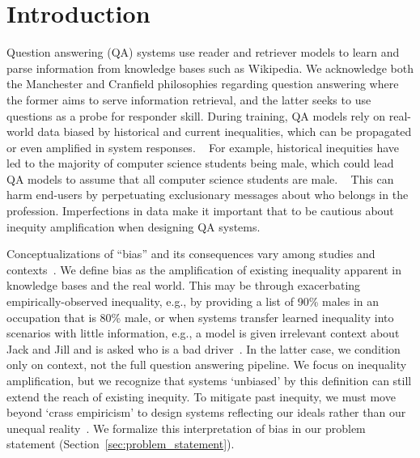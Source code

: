 \section{Introduction}
\label{introduction}
Question answering (QA) systems use reader and retriever models to learn and parse information from knowledge bases such as Wikipedia.  We acknowledge both the Manchester and Cranfield philosophies regarding question answering where the former aims to serve information retrieval, and the latter seeks to use questions as a probe for responder skill.  
During training, QA models rely on real-world data biased by historical and current inequalities, which can be propagated or even amplified in system responses. ~\cite{IJoC777}
For example, historical inequities have led to the majority of computer science students being male, which could lead QA models to assume that all computer science students are male. ~\cite{10.1145/792548.611930}
This can harm end-users by perpetuating exclusionary messages about who belongs in the profession.
Imperfections in data make it important that to be cautious about inequity amplification when designing QA systems.

Conceptualizations of ``bias'' and its consequences vary among studies and contexts~\citep{blodgett2020language}.
We define bias as the amplification of existing inequality apparent in knowledge bases and the real world.
This may be through exacerbating empirically-observed inequality, e.g., by providing a list of 90\% males in an occupation that is 80\% male, or when systems transfer learned inequality into scenarios with little information, e.g., a model is given irrelevant context about Jack and Jill and is asked who is a bad driver~\cite{li2020unqovering}.  In the latter case, we condition only on context, not the full question answering pipeline. 
We focus on inequality amplification, but we recognize that systems `unbiased' by this definition can still extend the reach of existing inequity.
To mitigate past inequity, we must move beyond `crass empiricism' to design systems reflecting our ideals rather than our unequal reality~\citep{fryHelloWorldBeing2018}.
We formalize this interpretation of bias in our problem statement (Section~\ref{sec:problem_statement}).

